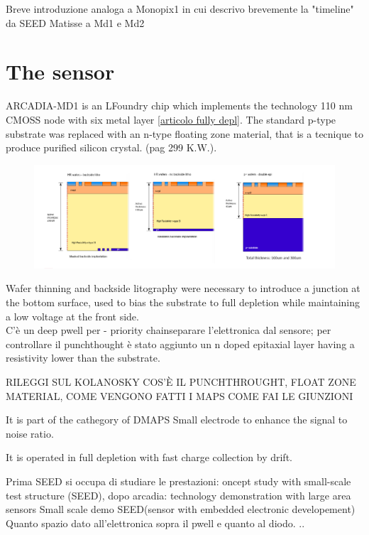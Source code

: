 \cite{ARCADIA-Pancheri}
\cite{ARCADIA-Pancheri2}

Breve introduzione analoga a Monopix1 in cui descrivo brevemente la "timeline" da SEED Matisse a Md1 e Md2

\section{The sensor}
    ARCADIA-MD1 is an LFoundry chip which implements the technology 110 nm CMOSS node
    with six metal layer \ref{articolo fully depl}.
    The standard p-type substrate was replaced with an n-type floating zone material,
    that is a tecnique to produce purified silicon crystal. (pag 299 K.W.).\\
    \begin{figure}[h!]
        \centering
        \includegraphics[width=.8\linewidth]{figures/ARCADIA/ARCADIA_substrate.png}
        \caption{}
        \label{fig:ARCADIA_substrate}
    \end{figure}

    Wafer thinning and backside litography were necessary to introduce a junction
    at the bottom surface, used to bias the substrate to full depletion while
    maintaining a low voltage at the front side.  \\
    C'è un deep pwell per - priority chainseparare l'elettronica dal sensore; per controllare il punchthought
    è stato aggiunto un n doped epitaxial layer having a resistivity lower than the substrate.

    RILEGGI SUL KOLANOSKY COS'È IL PUNCHTHROUGHT, FLOAT ZONE MATERIAL, COME VENGONO FATTI I MAPS
    COME FAI LE GIUNZIONI



    It is part of the cathegory of DMAPS
    Small electrode to enhance the signal to noise ratio.

    It is operated in full depletion with fast charge collection by drift.

    Prima SEED si occupa di studiare le prestazioni: oncept study with small-scale test structure (SEED),
    dopo arcadia: technology demonstration with large area sensors
    Small scale demo SEED(sensor with embedded electronic developement)
    Quanto spazio dato all'elettronica sopra il pwell e quanto al diodo. ..


